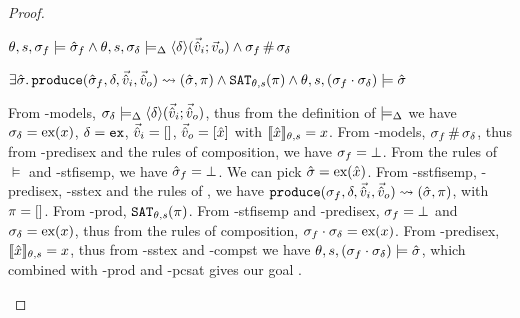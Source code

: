 \begin{proof}
\pfassume \begin{hypvlist}
 $\theta, s, \sigma_f \models \hat{\sigma}_f \land \theta, s, \sigma_\delta \models_{\Delta} \left<\delta\right>\!(\vec{\hat{v}}_i;\vec{v}_o) \land \sigma_f\operatorname{\#}\sigma_\delta$
\end{hypvlist}
\pfprove \begin{goalvlist}
 $\exists \hat{\sigma}\ldotp \texttt{produce}(\hat{\sigma}_f,\delta,\vec{\hat{v}}_i,\vec{\hat{v}}_o)\rightsquigarrow (\hat{\sigma},\pi) \land \texttt{SAT}_{\mathit{\theta,s}}(\pi) \land \theta,s,(\sigma_f\cdot\sigma_\delta) \models \hat{\sigma}$
\end{goalvlist}
\begin{hypvlist}
 From \hyp{models}, $\sigma_\delta\models_{\Delta} \left<\delta\right>\!(\vec{\hat{v}}_i;\vec{\hat{v}}_o)$, thus from the definition of $\models_{\Delta}$ we have $\sigma_\delta=\text{ex}(x)$, $\delta=\texttt{ex}$, $\vec{\hat{v}}_i=[]$, $\vec{\hat{v}}_o=[\hat{x}]$ with $\llbracket\hat{x}\rrbracket_{\theta,s}=x$.
 From \hyp{models}, $\sigma_f\operatorname{\#}\sigma_\delta$, thus from \hyp{predisex} and the rules of composition, we have $\sigma_f=\bot$.
 From the rules of $\models$ and \hyp{stfisemp}, we have $\hat{\sigma}_f=\bot$.
 We can pick $\hat{\sigma}=\text{ex}(\hat{x})$.
 From \hyp{sstfisemp}, \hyp{predisex}, \hyp{sstex} and the rules of \produce, we have ${\texttt{produce}(\sigma_f,\delta,\vec{\hat{v}}_i,\vec{\hat{v}}_o)\rightsquigarrow (\hat{\sigma},\pi)}$, with $\pi=[]$.
 From \hyp{prod}, $\texttt{SAT}_{\mathit{\theta,s}}(\pi)$.
 From \hyp{stfisemp} and \hyp{predisex}, $\sigma_f=\bot$ and $\sigma_\delta=\text{ex}(x)$, thus from the rules of composition, $\sigma_f\cdot\sigma_\delta=\text{ex}(x)$. 
 From \hyp{predisex}, $\llbracket\hat{x}\rrbracket_{\theta,s}=x$, thus from \hyp{sstex} and \hyp{compst} we have $\theta,s,(\sigma_f\cdot\sigma_\delta)\models\hat{\sigma}$, which combined with \hyp{prod} and \hyp{pcsat} gives our goal .
\end{hypvlist}

\end{proof}